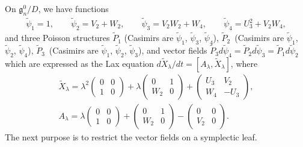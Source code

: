 \documentclass[10pt,a4paper]{amsart}
\numberwithin{equation}{section}
\begin{document}
On $\mathfrak{g}^0_n/D$, we have functions
\begin{gather*}
\widetilde{\psi}_1 = 1, \qquad \widetilde{\psi}_2 = V_2 + W_2 , \qquad
\widetilde{\psi}_3 = V_2W_2 + W_4, \qquad \widetilde{\psi}_4 = U_3^2 + V_2W_4,
\end{gather*}
and three Poisson structures $\widetilde{P}_1$ (Casimirs are $\widetilde{\psi}_1$, $\widetilde{\psi}_3$, $\widetilde{\psi}_4$), $\widetilde{P}_2$~(Casimirs are $\widetilde{\psi}_1$, $\widetilde{\psi}_2$, $\widetilde{\psi}_4$), $\widetilde{P}_3$~(Casimirs are $\widetilde{\psi}_1$, $\widetilde{\psi}_2$, $\widetilde{\psi}_3$), and vector f\/ields $\widetilde{P}_3d\widetilde{\psi}_4 = \widetilde{P}_2 d\widetilde{\psi}_3 = \widetilde{P}_1d\widetilde{\psi}_2$
which are expressed as the Lax equation $d\widetilde{X}_\lambda /dt = [A_\lambda, \widetilde{X}_\lambda ]$, where
\begin{gather*}
\widetilde{X}_\lambda = \lambda ^2 \left(
\begin{matrix}
0 & 0 \\
1 & 0
\end{matrix}
\right) + \lambda \left(
\begin{matrix}
0 & 1 \\
W_2 & 0
\end{matrix}
\right) + \left(
\begin{matrix}
U_3 & V_2 \\
W_4 & -U_3
\end{matrix}
\right), \\
A_\lambda = \lambda \left(
\begin{matrix}
0 & 0 \\
1 & 0
\end{matrix}
\right) + \left(
\begin{matrix}
0 & 1 \\
W_2 & 0
\end{matrix}
\right) - \left(
\begin{matrix}
0 & 0 \\
V_2 & 0
\end{matrix}
\right).
\end{gather*}
The next purpose is to restrict the vector f\/ields on a symplectic leaf.
\end{document}

